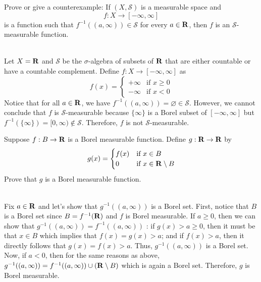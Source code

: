 \begin{exercise}
    Prove or give a counterexample: If $(X, \mathcal{S})$ is a measurable space and 
    $$f : X \to [-\infty, \infty]$$
    is a function such that $f^{-1}((a, \infty)) \in \mathcal{S}$ for every $a \in \mathbf{R}$, then $f$ is an $\mathcal{S}$-measurable function. \\
\end{exercise}

\begin{solution}
    \\ Let $X = \mathbf{R}$ and $\mathcal{S}$ be the $\sigma$-algebra of subsets of $\mathbf{R}$ that are either countable or have a countable complement. Define $f : X \to [-\infty, \infty]$ as
    $$f(x) = \begin{cases}
        +\infty & \text{if } x\geq 0 \\
        -\infty & \text{if } x < 0
    \end{cases}$$
    Notice that for all $a \in \mathbf{R}$, we have $f^{-1}((a, \infty)) = \varnothing \in \mathcal{S}$. However, we cannot conclude that $f$ is $\mathcal{S}$-measurable because $\{\infty \}$ is a Borel subset of $[-\infty, \infty]$ but $f^{-1}(\{\infty\}) = [0, \infty) \notin \mathcal{S}$. Therefore, $f$ is not $\mathcal{S}$-measurable. \\
\end{solution}

\begin{exercise}
    Suppose $f : B \to \mathbf{R}$ is a Borel measurable function. Define $g : \mathbf{R} \to \mathbf{R}$ by
    $$g(x) = \begin{cases}
        f(x) & \text{if } x \in B \\
        0 & \text{if } x \in \mathbf{R} \setminus B
    \end{cases}$$
    Prove that $g$ is a Borel measurable function. \\
\end{exercise}

\begin{solution}
    \\ Fix $a \in \mathbf{R}$ and let's show that $g^{-1}((a, \infty))$ is a Borel set. First, notice that $B$ is a Borel set since $B = f^{-1}(\mathbf{R})$ and $f$ is Borel measurable. If $a \geq 0$, then we can show that $g^{-1}((a, \infty)) = f^{-1}((a, \infty))$ : if $g(x) > a \geq 0$, then it must be that $x \in B$ which implies that $f(x) = g(x) > a$; and if $f(x) > a$, then it directly follows that $g(x) = f(x) > a$. Thus, $g^{-1}((a, \infty))$ is a Borel set. Now, if $a < 0$, then for the same reasons as above, $g^{-1}((a, \infty)) = f^{-1}((a, \infty)) \cup (\mathbf{R} \setminus B)$ which is again a Borel set. Therefore, $g$ is Borel measurable.\\
\end{solution}

